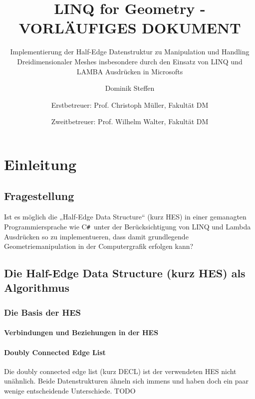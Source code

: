 \documentclass[12pt,a4paper]{scrreprt}
\author{
Dominik Steffen \and
Erstbetreuer: Prof. Christoph Müller, Fakultät DM \and
Zweitbetreuer: Prof. Wilhelm Walter, Fakultät DM
}
\title{LINQ for Geometry - VORLÄUFIGES DOKUMENT}
\subtitle{Implementierung der Half-Edge Datenstruktur zu Manipulation und Handling Dreidimensionaler Meshes insbesondere durch den Einsatz von LINQ und LAMBA Ausdrücken in Microsofts \CS}
\newcommand{\CSS}{C\texttt{\# }}
\begin{document}
\maketitle
\newpage

\begingroup
	\clearpage
	\pagestyle{empty}
	\renewcommand*{\chapterpagestyle}{empty}
	\tableofcontents
	\clearpage
\endgroup

\pagestyle{plain}
\setcounter{page}{1}










\chapter {Einleitung}
	\section {Fragestellung}
		Ist es möglich die „Half-Edge Data Structure“ (kurz HES) in einer gemanagten Programmiersprache wie \CSS unter der Berücksichtigung von LINQ und Lambda Ausdrücken so zu implementueren, dass damit grundlegende Geometriemanipulation in der Computergrafik erfolgen kann?
	\section {Die Half-Edge Data Structure (kurz HES) als Algorithmus}
		\subsection {Die Basis der HES}
			\subsubsection {Verbindungen und Beziehungen in der HES}
			\subsubsection {Doubly Connected Edge List}
			Die doubly connected edge list (kurz DECL) ist der verwendeten HES nicht unähnlich. Beide Datenstrukturen ähneln sich immens und haben doch ein paar wenige entscheidende Unterschiede. TODO
\end{document}
